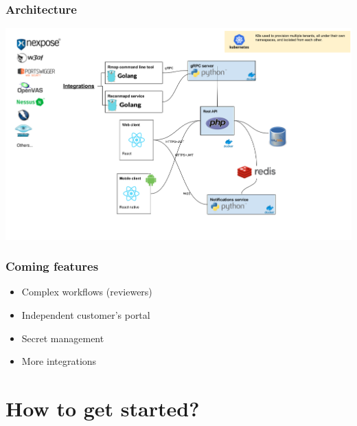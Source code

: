 \documentclass{beamer}
\begin{document}
\begin{frame}
	\frametitle{Architecture}

	\includegraphics[width=\textwidth]{images/reconmap-architecture.png}
\end{frame}


\begin{frame}
	\frametitle{Coming features}
	
	\begin{itemize}
		\item Complex workflows (reviewers)
		\item Independent customer's portal
		\item Secret management
		\item More integrations
	\end{itemize}
\end{frame}

\section{How to get started?}
\end{document}
